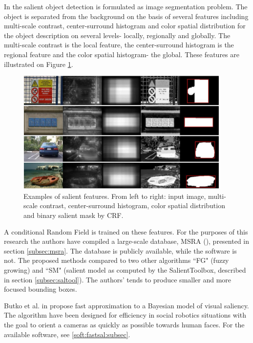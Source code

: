 In \cite{LiuCVPR2007} the salient object detection is formulated as image segmentation problem. The object is separated from the background on the basis of several features including multi-scale contrast, center-surround histogram and color spatial distribution for the object description on several levels- locally, regionally and globally. The multi-scale contrast is the local feature, the center-surround histogram is the regional feature and the color spatial histogram- the global. These features are illustrated on Figure \ref{fig:sal_feat_liu07}.
\begin{figure}[H]
\begin{center}
\includegraphics[width=0.95\textwidth]{fig/SalientFeatures_Liu2007}
\end{center}
\caption{Examples of salient features. From left to right: input image, multi-scale contrast, center-surround histogram, color spatial distribution and binary salient mask by CRF.}
\label{fig:sal_feat_liu07}
\end{figure}
A conditional Random Field is trained on these features. 
For the purposes of this research the authors have compiled a large-scale database, MSRA (\cite{msra_db}), presented in section \ref{subsec:msra}. The database is publicly available, while the software is not. The proposed methods compared to two other algorithms ``FG" (fuzzy growing) and ``SM" (salient model as computed by the SalientToolbox, described in section \ref{subsec:saltool}). The authors' tends to produce smaller and more focused bounding boxes.

Butko et al. in \cite{ButkoZCM08} propose fast approximation to a Bayesian model of visual saliency. The algorithm have been designed for efficiency in social robotics situations with the goal to orient a cameras as quickly as possible towards human faces. For the available software, see \ref{soft:fastsal:subsec}.

